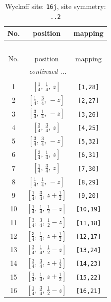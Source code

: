 \documentclass[fleqn,8pt]{jsarticle}
\begin{document}
\begin{longtable}{ccc}
\caption{Wyckoff site: {\tt 16j}, site symmetry: {\tt ..2}}
 \\
 \hline \hline
No. & position & mapping \\ \hline \endfirsthead

\multicolumn{2}{l}{\tablename\ \thetable{}} \\
 \hline \hline
No. & position & mapping \\ \hline \endhead

 \hline \hline
\multicolumn{2}{r}{\footnotesize\it continued ...} \\ \endfoot

 \hline \hline
\multicolumn{2}{r}{} \\ \endlastfoot

1 & $\left[ \frac{1}{4},\, \frac{1}{4},\, z \right]$ & {\tt [1,28]} \\ \hline
2 & $\left[ \frac{1}{4},\, \frac{3}{4},\, - z \right]$ & {\tt [2,27]} \\ \hline
3 & $\left[ \frac{3}{4},\, \frac{1}{4},\, - z \right]$ & {\tt [3,26]} \\ \hline
4 & $\left[ \frac{3}{4},\, \frac{3}{4},\, z \right]$ & {\tt [4,25]} \\ \hline
5 & $\left[ \frac{3}{4},\, \frac{3}{4},\, - z \right]$ & {\tt [5,32]} \\ \hline
6 & $\left[ \frac{3}{4},\, \frac{1}{4},\, z \right]$ & {\tt [6,31]} \\ \hline
7 & $\left[ \frac{1}{4},\, \frac{3}{4},\, z \right]$ & {\tt [7,30]} \\ \hline
8 & $\left[ \frac{1}{4},\, \frac{1}{4},\, - z \right]$ & {\tt [8,29]} \\ \hline
9 & $\left[ \frac{1}{4},\, \frac{3}{4},\, z + \frac{1}{2} \right]$ & {\tt [9,20]} \\ \hline
10 & $\left[ \frac{1}{4},\, \frac{1}{4},\, \frac{1}{2} - z \right]$ & {\tt [10,19]} \\ \hline
11 & $\left[ \frac{3}{4},\, \frac{3}{4},\, \frac{1}{2} - z \right]$ & {\tt [11,18]} \\ \hline
12 & $\left[ \frac{3}{4},\, \frac{1}{4},\, z + \frac{1}{2} \right]$ & {\tt [12,17]} \\ \hline
13 & $\left[ \frac{3}{4},\, \frac{1}{4},\, \frac{1}{2} - z \right]$ & {\tt [13,24]} \\ \hline
14 & $\left[ \frac{3}{4},\, \frac{3}{4},\, z + \frac{1}{2} \right]$ & {\tt [14,23]} \\ \hline
15 & $\left[ \frac{1}{4},\, \frac{1}{4},\, z + \frac{1}{2} \right]$ & {\tt [15,22]} \\ \hline
16 & $\left[ \frac{1}{4},\, \frac{3}{4},\, \frac{1}{2} - z \right]$ & {\tt [16,21]} \\
\end{longtable}
\end{document}
